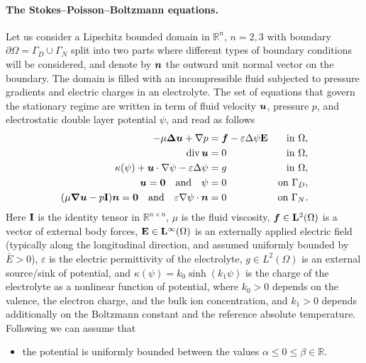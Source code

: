 \paragraph{The Stokes--Poisson--Boltzmann equations.} Let us consider a Lipschitz bounded domain in $\mathbb{R}^n$, $n=2,3$ with boundary $\partial\Omega = \Gamma_D \cup \Gamma_N$ split into two parts where different types of boundary conditions will be considered, and denote by $\boldsymbol{n}$ the outward unit normal vector on the boundary.  The domain is filled with an incompressible fluid subjected to  pressure gradients and electric charges in an electrolyte. The set of equations that govern the stationary regime  are written in term of fluid velocity $\boldsymbol{u}$, pressure $p$, and electrostatic double layer potential $\psi$, and read as follows 
\begin{subequations}
\label{eq:strong}
\begin{align}
-\mu \boldsymbol{\Delta}\boldsymbol{u} + \nabla p & = \boldsymbol{f} - \varepsilon \Delta \psi \mathbf{E} & \text{in } \Omega, \label{eq:mom}\\
\operatorname{div} \boldsymbol{u} & = 0 & \text{in } \Omega,\label{eq:mass}\\
\kappa(\psi) +  \boldsymbol{u} \cdot \nabla \psi - \varepsilon \Delta \psi & = g & \text{in } \Omega, \label{eq:pot}\\
\boldsymbol{u} = \boldsymbol{0} \quad \text{and} \quad \psi & = 0 & \text{on } \Gamma_D, \label{eq:bcD}\\
(\mu \boldsymbol{\nabla} \boldsymbol{u} - p\mathbf{I})\boldsymbol{n} = \boldsymbol{0} \quad \text{and}\quad \varepsilon\nabla \psi \cdot \boldsymbol{n} & = 0  & \text{on } \Gamma_N.\label{eq:bcN}
\end{align}\end{subequations}
Here $\mathbf{I}$ is the identity tensor in $\mathbb{R}^{n\times n}$, $\mu$ is the fluid viscosity, $\boldsymbol{f} \in \mathbf{L}^2(\Omega)$ is a vector  of external body forces, $\mathbf{E} \in \mathbf{L}^\infty(\Omega)$ is an externally applied electric field (typically along the longitudinal direction, and assumed uniformly bounded by $\bar{E}>0$), $\varepsilon$ is the electric permittivity of the electrolyte, $g\in L^2(\Omega)$ is an external source/sink of potential, and 
$ \kappa(\psi) = k_0 \sinh(k_1 \psi)$ 
is the charge of the electrolyte as a nonlinear function of potential, where $k_0>0$ depends on the valence, the electron charge, and the bulk ion concentration, and $k_1>0$ depends additionally on the Boltzmann constant and the reference absolute temperature.  
%
Following \cite[Lem. 2.1]{holst12} we can assume that 
\begin{itemize}
\item the potential is uniformly bounded between the values $\alpha \leq 0 \leq \beta \in \mathbb{R}$. 
\end{itemize}
